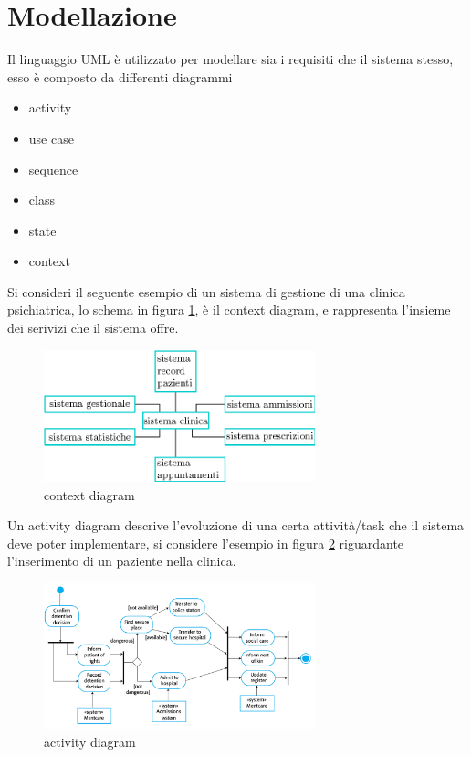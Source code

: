 \documentclass[10pt, letterpaper]{report}
\begin{document}
\section{Modellazione}
Il linguaggio UML è utilizzato per modellare sia i requisiti che il sistema stesso, 
esso è composto da differenti diagrammi\begin{itemize}
    \item activity 
    \item use case 
    \item sequence 
    \item class 
    \item state 
    \item context
\end{itemize}
Si consideri il seguente esempio di un sistema di gestione di una clinica psichiatrica, 
lo schema in figura \ref{clinica}, è il context diagram, e rappresenta l'insieme dei serivizi che il 
sistema offre.
\begin{figure}[h!]
    \centering 
    \includegraphics[width=0.7\textwidth ]{images/context.eps}
    \caption{context diagram}
    \label{clinica}
\end{figure}
Un activity diagram descrive l'evoluzione di una certa attività/task che il sistema 
deve poter implementare, si considere l'esempio in figura \ref{activity} riguardante 
l'inserimento di un paziente nella clinica.
\begin{figure}[h!]
    \centering 
    \includegraphics[width=0.7\textwidth ]{images/acrivity.png}
    \caption{activity diagram}
    \label{activity}
\end{figure}
\end{document}
